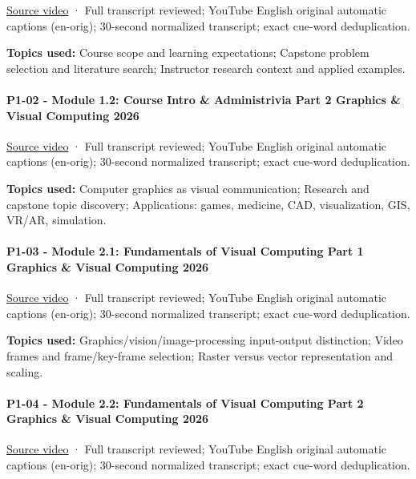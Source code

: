 \href{https://www.youtube.com/watch?v=dA0O3xbMhZw}{Source video} · Full transcript reviewed; YouTube English original automatic captions (en-orig); 30-second normalized transcript; exact cue-word deduplication.

\textbf{Topics used:} Course scope and learning expectations; Capstone problem selection and literature search; Instructor research context and applied examples.

\paragraph{P1-02 - Module 1.2: Course Intro \& Administrivia Part 2 Graphics \& Visual Computing 2026}\label{p1-02---module-1.2-course-intro-administrivia-part-2-graphics-visual-computing-2026}

\href{https://www.youtube.com/watch?v=SAqv-gqy0tA}{Source video} · Full transcript reviewed; YouTube English original automatic captions (en-orig); 30-second normalized transcript; exact cue-word deduplication.

\textbf{Topics used:} Computer graphics as visual communication; Research and capstone topic discovery; Applications: games, medicine, CAD, visualization, GIS, VR/AR, simulation.

\paragraph{P1-03 - Module 2.1: Fundamentals of Visual Computing Part 1 Graphics \& Visual Computing 2026}\label{p1-03---module-2.1-fundamentals-of-visual-computing-part-1-graphics-visual-computing-2026}

\href{https://www.youtube.com/watch?v=hoZcPvCIFyk}{Source video} · Full transcript reviewed; YouTube English original automatic captions (en-orig); 30-second normalized transcript; exact cue-word deduplication.

\textbf{Topics used:} Graphics/vision/image-processing input-output distinction; Video frames and frame/key-frame selection; Raster versus vector representation and scaling.

\paragraph{P1-04 - Module 2.2: Fundamentals of Visual Computing Part 2 Graphics \& Visual Computing 2026}\label{p1-04---module-2.2-fundamentals-of-visual-computing-part-2-graphics-visual-computing-2026}

\href{https://www.youtube.com/watch?v=KyFhkeTwnDE}{Source video} · Full transcript reviewed; YouTube English original automatic captions (en-orig); 30-second normalized transcript; exact cue-word deduplication.

